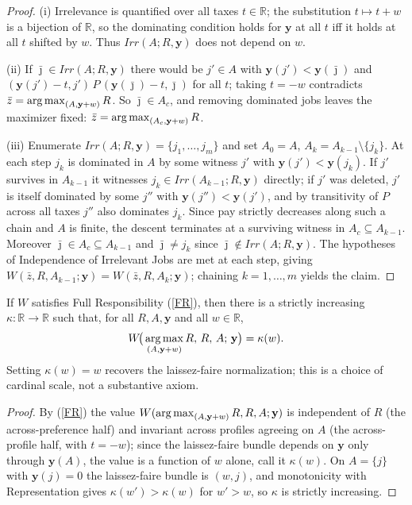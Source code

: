 \begin{proof}
(i) Irrelevance is quantified over all taxes $t\in\mathbb R$; the substitution
$t\mapsto t+w$ is a bijection of $\mathbb R$, so the dominating condition holds
for $\mathbf y$ at all $t$ iff it holds at all $t$ shifted by $w$. Thus
$Irr(A;R,\mathbf y)$ does not depend on $w$.

(ii) If $\bar\jmath\in Irr(A;R,\mathbf y)$ there would be $j'\in A$ with
$\mathbf y(j')<\mathbf y(\bar\jmath)$ and
$(\mathbf y(j')-t,j')\,P\,(\mathbf y(\bar\jmath)-t,\bar\jmath)$ for all $t$;
taking $t=-w$ contradicts $\bar z=\operatorname*{arg\,max}_{(A,\mathbf y+w)}R$. So
$\bar\jmath\in A_c$, and removing dominated jobs leaves the maximizer fixed:
$\bar z=\operatorname*{arg\,max}_{(A_c,\mathbf y+w)}R$.

(iii) Enumerate $Irr(A;R,\mathbf y)=\{j_1,\dots,j_m\}$ and set $A_0=A$,
$A_k=A_{k-1}\setminus\{j_k\}$. At each step $j_k$ is dominated in $A$ by some
witness $j'$ with $\mathbf y(j')<\mathbf y(j_k)$. If $j'$ survives in
$A_{k-1}$ it witnesses $j_k\in Irr(A_{k-1};R,\mathbf y)$ directly; if $j'$ was
deleted, $j'$ is itself dominated by some $j''$ with
$\mathbf y(j'')<\mathbf y(j')$, and by transitivity of $P$ across all taxes
$j''$ also dominates $j_k$. Since pay strictly decreases along such a chain and
$A$ is finite, the descent terminates at a surviving witness in
$A_c\subseteq A_{k-1}$. Moreover $\bar\jmath\in A_c\subseteq A_{k-1}$ and
$\bar\jmath\neq j_k$ since $\bar\jmath\notin Irr(A;R,\mathbf y)$. The hypotheses
of Independence of Irrelevant Jobs are met at each step, giving
$W(\bar z,R,A_{k-1};\mathbf y)=W(\bar z,R,A_k;\mathbf y)$; chaining
$k=1,\dots,m$ yields the claim.
\end{proof}

\begin{lemma}
\label{lem:w3value}
If $W$ satisfies Full Responsibility (\ref{FR}), then there is a strictly
increasing $\kappa:\mathbb R\to\mathbb R$ such that, for all $R,A,\mathbf y$ and
all $w\in\mathbb R$,
\begin{equation*}
W\!\big(\operatorname*{arg\,max}_{(A,\mathbf y+w)}R,\,R,\,A;\,\mathbf y\big)=\kappa(w).
\end{equation*}
Setting $\kappa(w)=w$ recovers the laissez-faire normalization; this is a choice
of cardinal scale, not a substantive axiom.
\end{lemma}

\begin{proof}
By (\ref{FR}) the value $W(\operatorname*{arg\,max}_{(A,\mathbf y+w)}R,R,A;\mathbf y)$ is
independent of $R$ (the across-preference half) and invariant across profiles
agreeing on $A$ (the across-profile half, with $t=-w$); since the laissez-faire
bundle depends on $\mathbf y$ only through $\mathbf y(A)$, the value is a
function of $w$ alone, call it $\kappa(w)$. On $A=\{j\}$ with $\mathbf y(j)=0$
the laissez-faire bundle is $(w,j)$, and monotonicity with Representation gives
$\kappa(w')>\kappa(w)$ for $w'>w$, so $\kappa$ is strictly increasing.
\end{proof}

